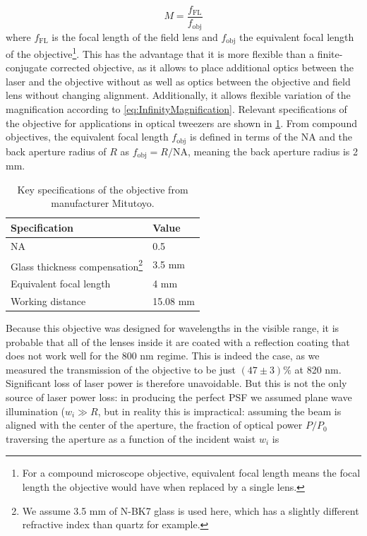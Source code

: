 \begin{equation}\label{eq:InfinityMagnification}
    M = \frac{
    f_{\text{FL}}
    }{
    f_{\text{obj}}
    }
\end{equation}
where $f_{\text{FL}}$ is the focal length of the field lens and $f_{\text{obj}}$ the equivalent focal length of the objective\footnote{For a compound microscope objective, equivalent focal length means the focal length the objective would have when replaced by a single lens.}.
This has the advantage that it is more flexible than a finite-conjugate corrected objective, as it allows to place additional optics between the laser and the objective without as well as optics between the objective and field lens without changing alignment.
Additionally, it allows flexible variation of the magnification according to \cref{eq:InfinityMagnification}.
Relevant specifications of the objective for applications in optical tweezers are shown in \cref{table:MitutoyoSpecs}. 
From compound objectives, the equivalent focal length $f_{\text{obj}}$ is defined in terms of the \ac{NA} and the back aperture radius of $R$ as $f_{\text{obj}} = R / \text{NA}$, meaning the back aperture radius is 2 mm.

\begin{table}[h]
    \centering
    \caption{Key specifications of the objective from manufacturer Mitutoyo.}
    \label{table:MitutoyoSpecs}
    \begin{tabular}{l | l}
        \textbf{Specification}       & \textbf{Value} \\ \hline 
        NA                           & 0.5            \\ \hline
        Glass thickness compensation\footnote{We assume 3.5 mm of N-BK7 glass is used here, which has a slightly different refractive index than quartz for example.} & 3.5 mm         \\ \hline
        Equivalent focal length      & 4 mm           \\ \hline
        Working distance             & 15.08 mm      
    \end{tabular}
\end{table}
\noindent Because this objective was designed for wavelengths in the visible range, it is probable that all of the lenses inside it are coated with a reflection coating that does not work well for the 800 nm regime. 
This is indeed the case, as we measured the transmission of the objective to be just $(47 \pm 3)\%$ at 820 nm. 
Significant loss of laser power is therefore unavoidable.
But this is not the only source of laser power loss: in producing the perfect \ac{PSF} we assumed plane wave illumination ($w_i \gg R$, but in reality this is impractical: assuming the beam is aligned with the center of the aperture, the fraction of optical power $P/P_0$ traversing the aperture as a function of the incident waist $w_i$ is

